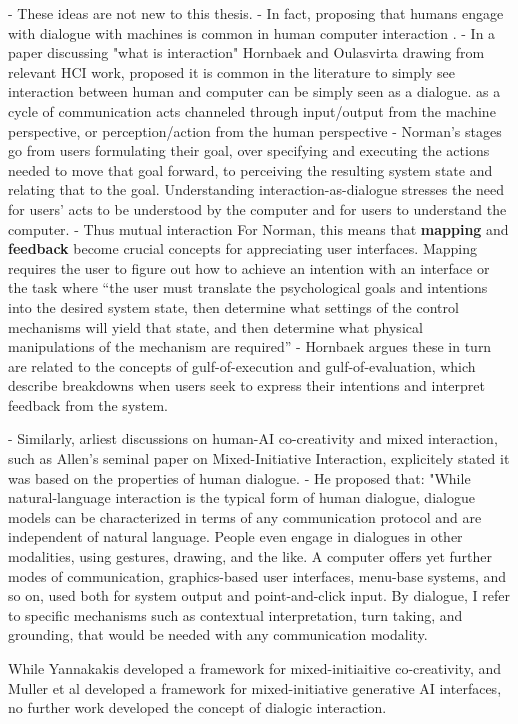 - These ideas are not new to this thesis. 
- In fact, proposing that humans engage with dialogue with machines is common in human computer interaction \cite{Suchman2006-bs}. 
- In a paper discussing "what is interaction" Hornbaek and Oulasvirta \cite{Hornbaek2017-wg} drawing from relevant HCI work, proposed it is common in the literature to simply see interaction between human and computer can be simply seen as a dialogue. as a cycle of communication acts channeled through input/output from the machine perspective, or perception/action from the human perspective
- Norman’s stages go from users formulating their goal, over specifying and executing the actions needed to move that goal forward, to perceiving the resulting system state and relating that to the goal. Understanding interaction-as-dialogue stresses the need for users’ acts to be understood by the computer and for users to understand the computer. 
- Thus mutual interaction
For Norman, this means that \textbf{mapping} and \textbf{feedback} become crucial concepts for appreciating user interfaces. Mapping requires the user to figure out how to achieve an intention with an interface or the task where “the user must translate the psychological goals and intentions into the desired system state, then determine what settings of the control mechanisms will yield that state, and then determine what physical manipulations of the mechanism are required”
- \cite{Hornbaek2017-wg} Hornbaek argues these in turn are related to the concepts of gulf-of-execution and gulf-of-evaluation, which describe breakdowns when users seek to express their intentions and interpret feedback from the system.

- Similarly, arliest discussions on human-AI co-creativity and mixed interaction, such as Allen's seminal paper on Mixed-Initiative Interaction, explicitely stated it was based on the properties of human dialogue. 
- He proposed that: "While natural-language interaction is the typical form of human dialogue, dialogue models can be characterized in terms of any communication protocol and are independent of natural language. People even engage in dialogues in other modalities, using gestures, drawing, and the like. A computer offers yet further modes of communication, graphics-based user interfaces, menu-base systems, and so on, used both for system output and point-and-click input. By dialogue, I refer to specific mechanisms such as contextual interpretation, turn taking, and grounding, that would be needed with any communication modality.

While Yannakakis \cite{Yannakakis2014-zs} developed a framework for mixed-initiaitive co-creativity, and Muller et al \cite{Muller2020-nv} developed a framework for mixed-initiative generative AI interfaces, no further work developed the concept of dialogic interaction. 

